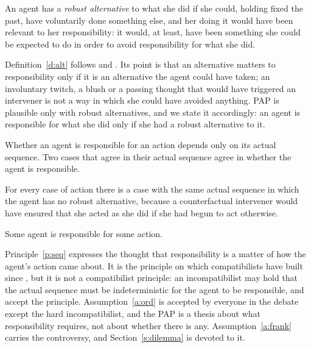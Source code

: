 \documentclass{situationist-preprint}
\begin{document}
\begin{definition}\label{d:alt}
An agent has a \emph{robust alternative} to what she did if she could, holding fixed the past, have voluntarily done something else, and her doing it would have been relevant to her responsibility: it would, at least, have been something she could be expected to do in order to avoid responsibility for what she did.
\end{definition}

Definition~\ref{d:alt} follows \citet{Fischer1994} and \citet{Pereboom2001}. Its point is that an alternative matters to responsibility only if it is an alternative the agent could have taken; an involuntary twitch, a blush or a passing thought that would have triggered an intervener is not a way in which she could have avoided anything. PAP is plausible only with robust alternatives, and we state it accordingly: an agent is responsible for what she did only if she had a robust alternative to it.

\begin{principle}\label{p:seq}
Whether an agent is responsible for an action depends only on its actual sequence. Two cases that agree in their actual sequence agree in whether the agent is responsible.
\end{principle}

\begin{assumption}\label{a:frank}
For every case of action there is a case with the same actual sequence in which the agent has no robust alternative, because a counterfactual intervener would have ensured that she acted as she did if she had begun to act otherwise.
\end{assumption}

\begin{assumption}[Responsibility]\label{a:ord}
Some agent is responsible for some action.
\end{assumption}

Principle~\ref{p:seq} expresses the thought that responsibility is a matter of how the agent's action came about. It is the principle on which compatibilists have built since \citet{FischerRavizza1998}, but it is not a compatibilist principle: an incompatibilist may hold that the actual sequence must be indeterministic for the agent to be responsible, and accept the principle. Assumption~\ref{a:ord} is accepted by everyone in the debate except the hard incompatibilist, and the PAP is a thesis about what responsibility requires, not about whether there is any. Assumption~\ref{a:frank} carries the controversy, and Section~\ref{s:dilemma} is devoted to it.
\end{document}
